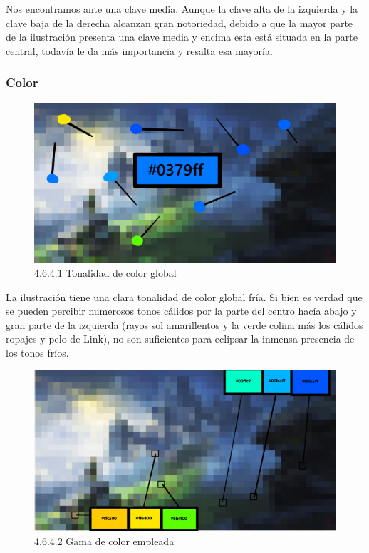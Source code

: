 \documentclass[12pt]{article}
\begin{document}
    Nos encontramos ante una clave media. Aunque la clave alta de la izquierda y la clave baja de la derecha alcanzan gran notoriedad, debido a que la mayor parte de la ilustración presenta una clave media y encima esta está situada en la parte central, todavía le da más importancia y resalta esa mayoría.


        \subsubsection{Color}


    \begin{figure}[H]
      \centering
      \includegraphics[scale=0.4]{images/Nerea/Nerea Zelda concept 641.PNG}
      \caption{\small 4.6.4.1 Tonalidad de color global}
    \end{figure}

    La ilustración tiene una clara tonalidad de color global fría. Si bien es verdad que se pueden percibir numerosos tonos cálidos por la parte del centro hacía abajo y gran parte de la izquierda (rayos sol amarillentos y la verde colina más los cálidos ropajes y pelo de Link), no son suficientes para eclipsar la inmensa presencia de los tonos fríos.

    \begin{figure}[H]
      \centering
      \includegraphics[scale=0.4]{images/Nerea/Nerea Zelda concept 642.PNG}
      \caption{\small 4.6.4.2 Gama de color empleada}
    \end{figure}
\end{document}
